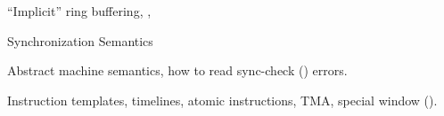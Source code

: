 
``Implicit'' ring buffering, , 

 {Synchronization Semantics}

Abstract machine semantics, how to read sync-check () errors.


Instruction templates, timelines, atomic instructions, TMA, special window ().


\clearpage

\clearpage

\clearpage

\clearpage

\clearpage

\clearpage

\clearpage

\clearpage

\clearpage

\clearpage



